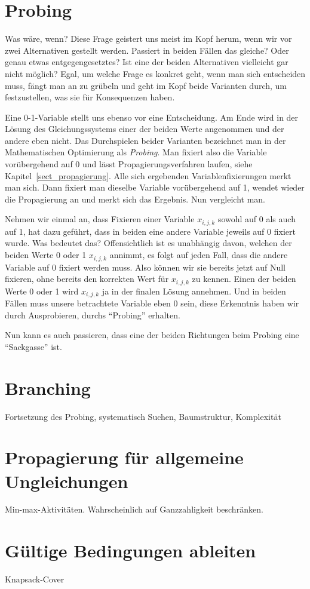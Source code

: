 \section{Probing}
\label{sect_probing}
Was wäre, wenn? Diese Frage geistert uns meist im Kopf herum, wenn wir vor zwei Alternativen gestellt werden. Passiert in beiden Fällen das gleiche? Oder genau etwas entgegengesetztes? Ist eine der beiden Alternativen vielleicht gar nicht möglich? Egal, um welche Frage es konkret geht, wenn man sich entscheiden muss, fängt man an zu grübeln und geht im Kopf beide Varianten durch, um festzustellen, was sie für Konsequenzen haben.

Eine 0-1-Variable stellt uns ebenso vor eine Entscheidung. Am Ende wird in der Lösung des Gleichungssystems einer der beiden Werte angenommen und der andere eben nicht. Das Durchspielen beider Varianten bezeichnet man in der Mathematischen Optimierung als \emph{Probing}. Man fixiert also die Variable vorübergehend auf 0 und lässt Propagierungsverfahren laufen, siehe Kapitel~\ref{sect_propagierung}. Alle sich ergebenden Variablenfixierungen merkt man sich. Dann fixiert man dieselbe Variable vorübergehend auf 1, wendet wieder die Propagierung an und merkt sich das Ergebnis. Nun vergleicht man. 

Nehmen wir einmal an, dass Fixieren einer Variable $x_{i,j,k}$ sowohl auf 0 als auch auf 1, hat dazu geführt, dass in beiden eine andere Variable jeweils auf 0 fixiert wurde. Was bedeutet das? Offensichtlich ist es unabhängig davon, welchen der beiden Werte 0 oder 1 $x_{i,j,k}$ annimmt, es folgt auf jeden Fall, dass die andere Variable auf 0 fixiert werden muss. Also können wir sie bereits jetzt auf Null fixieren, ohne bereits den korrekten Wert für  $x_{i,j,k}$ zu kennen. Einen der beiden Werte 0 oder 1 wird $x_{i,j,k}$ ja in der finalen Lösung annehmen. Und in beiden Fällen muss unsere betrachtete Variable eben 0 sein, diese Erkenntnis haben wir durch Ausprobieren, durchs ``Probing'' erhalten. 

Nun kann es auch passieren, dass eine der beiden Richtungen beim Probing eine ``Sackgasse'' ist.


\section{Branching}

\label{sect_branching}
Fortsetzung des Probing, systematisch Suchen, Baumstruktur,
Komplexität

\section{Propagierung für allgemeine Ungleichungen}
Min-max-Aktivitäten. Wahrscheinlich auf Ganzzahligkeit beschränken.

\section{Gültige Bedingungen ableiten}
Knapsack-Cover
